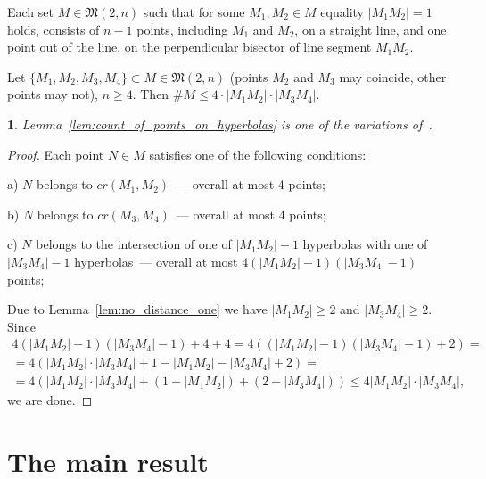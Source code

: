 \documentclass[11pt,twoside,draft
]{article}
\newtheorem{Remark}{\indent {\sc Remark}}
\renewcommand*{\&}{\textbackslash \symbol{38}}%
\begin{document}
\begin{lemma}
	\cite[Theorem 3.10]{my-pps-linear-bound-2019}
	\label{lem:no_distance_one}
	Each set $M\in\mathfrak{M}(2,n)$
	such that for some $M_1,M_2 \in M$ equality $|M_1 M_2|=1$ holds,
	consists of $n-1$ points, including $M_1$ and $M_2$, on a straight line,
	and one point out of the line, on the perpendicular bisector of line segment $M_1 M_2$.
\end{lemma}


\begin{lemma}
	\label{lem:count_of_points_on_hyperbolas}
	Let $\{M_1, M_2, M_3, M_4\} \subset M\in\overline{\mathfrak{M}}(2,n)$
	(points $M_2$ and $M_3$ may coincide, other points may not), $n\geq 4$.
	Then $\# M \leq 4 \cdot |M_1 M_2| \cdot |M_3 M_4|$.
\end{lemma}

\begin{Remark}
	Lemma~\ref{lem:count_of_points_on_hyperbolas} is one of the variations of~\cite{erdos1945integral}.
\end{Remark}

\begin{proof}
	Each point $N\in M$ satisfies one of the following conditions:

	a) $N$ belongs to $cr(M_1,M_2)$~--- overall at most 4 points;

	b) $N$ belongs to $cr(M_3,M_4)$~--- overall at most 4 points;

	c) $N$ belongs to the intersection of one of $|M_1 M_2| - 1$ hyperbolas
	with one of $|M_3 M_4| - 1$ hyperbolas~--- overall at most $4 (|M_1 M_2| - 1)(|M_3 M_4| - 1)$ points;

	Due to Lemma~\ref{lem:no_distance_one} we have $|M_1 M_2| \geq 2$ and $|M_3 M_4| \geq 2$.
	Since
	\begin{multline}
		4 (|M_1 M_2| - 1)(|M_3 M_4| - 1) + 4 + 4
		=
		4 ( (|M_1 M_2| - 1)(|M_3 M_4| - 1) + 2)
		=
		\\=
		4 ( |M_1 M_2| \cdot |M_3 M_4| + 1 - |M_1 M_2| - |M_3 M_4| + 2)
		=
		\\=
		4 ( |M_1 M_2| \cdot |M_3 M_4| + (1 - |M_1 M_2|) + (2 - |M_3 M_4|))
		\leq
		4 |M_1 M_2| \cdot |M_3 M_4|
		,
	\end{multline}
	we are done.
\end{proof}


\section{The main result}
\end{document}

